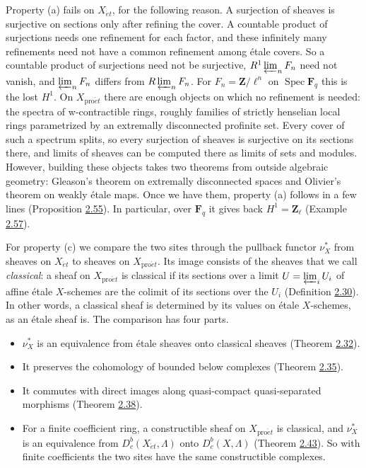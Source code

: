 \documentclass[11pt]{article}
\providecommand{\Dbc}{}\renewcommand{\Dbc}{D^b_c}
\begin{document}
Property (a) fails on \(X_{\acute{e}t}\), for the following reason. A surjection of sheaves is surjective on sections only after refining the cover. A countable product of surjections needs one refinement for each factor, and these infinitely many refinements need not have a common refinement among étale covers. So a countable product of surjections need not be surjective, \(R^1\varprojlim_nF_n\) need not vanish, and \(\varprojlim_nF_n\) differs from \(R\varprojlim_nF_n\). For \(F_n=\mathbf Z/\ell^n\) on \(\operatorname{Spec}\mathbf F_q\) this is the lost \(H^1\). On \(X_{\mathrm{pro}\acute{e}t}\) there are enough objects on which no refinement is needed: the spectra of w-contractible rings, roughly families of strictly henselian local rings parametrized by an extremally disconnected profinite set. Every cover of such a spectrum splits, so every surjection of sheaves is surjective on its sections there, and limits of sheaves can be computed there as limits of sets and modules. However, building these objects takes two theorems from outside algebraic geometry: Gleason's theorem on extremally disconnected spaces and Olivier's theorem on weakly étale maps. Once we have them, property (a) follows in a few lines (Proposition \hyperref[bp172]{2.55}). In particular, over \(\mathbf F_q\) it gives back \(H^1=\mathbf Z_\ell\) (Example \hyperref[bp178]{2.57}).

For property (c) we compare the two sites through the pullback functor \(\nu_X^*\) from sheaves on \(X_{\acute{e}t}\) to sheaves on \(X_{\mathrm{pro}\acute{e}t}\). Its image consists of the sheaves that we call \emph{classical}: a sheaf on \(X_{\mathrm{pro}\acute{e}t}\) is classical if its sections over a limit \(U=\varprojlim_iU_i\) of affine étale \(X\)-schemes are the colimit of its sections over the \(U_i\) (Definition \hyperref[bp91]{2.30}). In other words, a classical sheaf is determined by its values on étale \(X\)-schemes, as an étale sheaf is. The comparison has four parts.

\begin{itemize}
\item \(\nu_X^*\) is an equivalence from étale sheaves onto classical sheaves (Theorem \hyperref[bp95]{2.32}).
\item It preserves the cohomology of bounded below complexes (Theorem \hyperref[bp103]{2.35}).
\item It commutes with direct images along quasi-compact quasi-separated morphisms (Theorem \hyperref[bp113]{2.38}).
\item For a finite coefficient ring, a constructible sheaf on \(X_{\mathrm{pro}\acute{e}t}\) is classical, and \(\nu_X^*\) is an equivalence from \(D^b_c(X_{\acute{e}t},\Lambda)\) onto \(\Dbc(X,\Lambda)\) (Theorem \hyperref[bp129]{2.43}). So with finite coefficients the two sites have the same constructible complexes.
\end{itemize}
\end{document}
